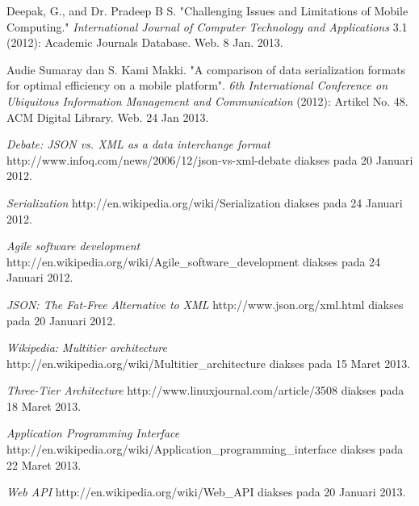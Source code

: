 \documentclass[a4paper, 12pt]{report}
\begin{document}
\begin{thebibliography}{99}
\singlespacing 


Deepak, G., and Dr. Pradeep B S. "Challenging Issues and Limitations of Mobile Computing."
  \emph{International Journal of Computer Technology and Applications} 3.1 (2012): Academic Journals Database. Web. 8 Jan. 2013.
  
Audie Sumaray dan S. Kami Makki. "A comparison of data serialization formats for optimal efficiency on a mobile platform". \emph{6th International Conference on Ubiquitous Information Management and Communication} (2012): Artikel No. 48. ACM Digital Library. Web. 24 Jan 2013.
  
  \emph{Debate: JSON vs. XML as a data interchange format}
  http://www.infoq.com/news/2006/12/json-vs-xml-debate
  diakses pada 20 Januari 2012.
  
  \emph{Serialization}
  http://en.wikipedia.org/wiki/Serialization
  diakses pada 24 Januari 2012.
  
  \emph{Agile software development}
  http://en.wikipedia.org/wiki/Agile\_software\_development
  diakses pada 24 Januari 2012.
  
  \emph{JSON: The Fat-Free Alternative to XML}
  http://www.json.org/xml.html
  diakses pada 20 Januari 2012.
  
  \emph{Wikipedia: Multitier architecture}
  http://en.wikipedia.org/wiki/Multitier\_architecture
  diakses pada 15 Maret 2013.
  
  \emph{Three-Tier Architecture}
  http://www.linuxjournal.com/article/3508
  diakses pada 18 Maret 2013.
  
  \emph{Application Programming Interface}
  http://en.wikipedia.org/wiki/Application\_programming\_interface
  diakses pada 22 Maret 2013.
  
  \emph{Web API}
  http://en.wikipedia.org/wiki/Web\_API
  diakses pada 20 Januari 2013.
  

\end{thebibliography}
\end{document}
